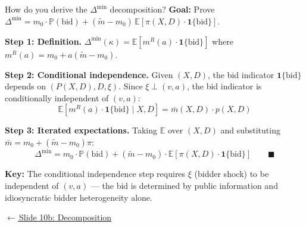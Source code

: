 \documentclass[aspectratio=169,10pt]{beamer}
\newcommand{\E}{\mathbb{E}}
\newcommand{\PP}{\mathbb{P}}
\newcommand{\1}{\mathbf{1}}
\newcommand{\returnlink}[2]{%
  \par\vspace{0.2em}\hfill{\scriptsize\hyperlink{#1}{\textcolor{brightblue}{$\leftarrow$\,#2}}}%
}
\begin{document}
\begin{frame}{How do you derive the $\Delta^{\min}$ decomposition?}
\hypertarget{backup:decomposition_proof}{}
\small
\textbf{Goal:} Prove $\Delta^{\min} = m_0 \cdot \PP(\text{bid}) + (\tilde{m} - m_0)\,\E[\pi(X,D) \cdot \1\{\text{bid}\}]$.

\vspace{0.3em}

\textbf{Step 1: Definition.} $\Delta^{\min}(\kappa) = \E[m^R(a) \cdot \1\{\text{bid}\}]$ where $m^R(a) = m_0 + a(\tilde{m} - m_0)$.

\vspace{0.3em}

\textbf{Step 2: Conditional independence.} Given $(X,D)$, the bid indicator $\1\{\text{bid}\}$ depends on $(P(X,D), D, \xi)$. Since $\xi \perp (v,a)$, the bid indicator is conditionally independent of $(v,a)$:
\[
\E[m^R(a) \cdot \1\{\text{bid}\} \mid X,D] = \bar{m}(X,D) \cdot p(X,D)
\]

\vspace{0.3em}

\textbf{Step 3: Iterated expectations.} Taking $\E$ over $(X,D)$ and substituting $\bar{m} = m_0 + (\tilde{m} - m_0)\pi$:
\[
\Delta^{\min} = m_0 \cdot \PP(\text{bid}) + (\tilde{m} - m_0) \cdot \E[\pi(X,D) \cdot \1\{\text{bid}\}] \qquad \blacksquare
\]

\vspace{0.2em}
{\footnotesize\textbf{Key:} The conditional independence step requires $\xi$ (bidder shock) to be independent of $(v,a)$ --- the bid is determined by public information and idiosyncratic bidder heterogeneity alone.}

\returnlink{main:decomposition}{Slide 10b: Decomposition}
\end{frame}
\end{document}
